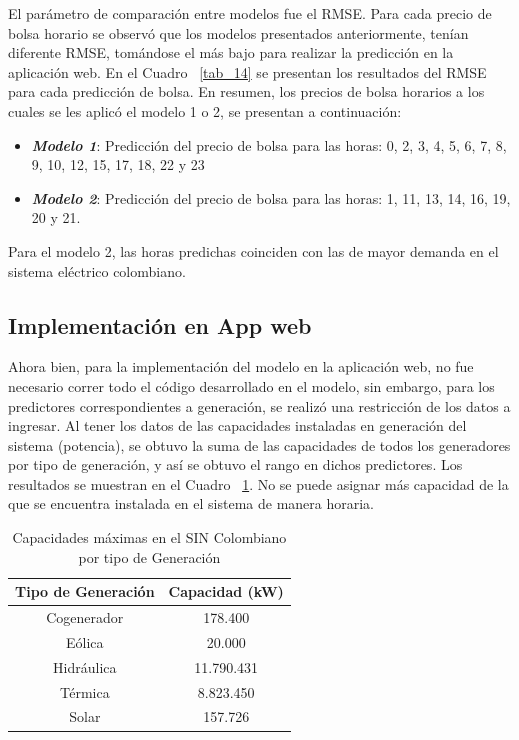 \documentclass[conference, 10pt]{IEEEtran}
\begin{document}
El parámetro de comparación entre modelos fue el RMSE. Para cada precio de bolsa horario se observó que los modelos presentados anteriormente, tenían diferente RMSE, tomándose el más bajo para realizar la predicción en la aplicación web. En el Cuadro ~\ref{tab_14} se presentan los resultados del RMSE para cada predicción de bolsa. En resumen, los precios de bolsa horarios a los cuales se les aplicó el modelo 1 o 2, se presentan a continuación: 

\begin{itemize}
\item \textit{\textbf{Modelo 1}}: Predicción del precio de bolsa para las horas: 0, 2, 3, 4, 5, 6, 7, 8, 9, 10, 12, 15, 17, 18, 22 y 23\item\textit{\textbf{Modelo 2}}: Predicción del precio de bolsa para las horas: 1, 11, 13, 14, 16, 19, 20 y 21.
\end{itemize}

Para el modelo 2, las horas predichas coinciden con las de mayor demanda en el sistema eléctrico colombiano. 

\subsection{Implementación en App web}
Ahora bien, para la implementación del modelo en la aplicación web, no fue necesario correr todo el código desarrollado en el modelo, sin embargo, para los predictores correspondientes a generación, se realizó una restricción de los datos a ingresar. Al tener los datos de las capacidades instaladas en generación del sistema (potencia), se obtuvo la suma de las capacidades de todos los generadores por tipo de generación, y así se obtuvo el rango en dichos predictores. Los resultados se muestran en el Cuadro ~\ref{tab_10}. No se puede asignar más capacidad de la que se encuentra instalada en el sistema de manera horaria.

\begin{table}[htbp]
\caption{Capacidades máximas en el SIN Colombiano por tipo de Generación}
\begin{center}
\begin{tabular}{|c|c|}
\hline
 Tipo de Generación&Capacidad (kW)\\
\hline 
Cogenerador&178.400\\
\hline
Eólica&20.000\\
\hline
Hidráulica&11.790.431\\
\hline
Térmica&8.823.450\\
\hline
Solar&157.726\\
  
	\hline
\end{tabular}
\label{tab_10}
\end{center}
\end{table}
  
\end{document}
